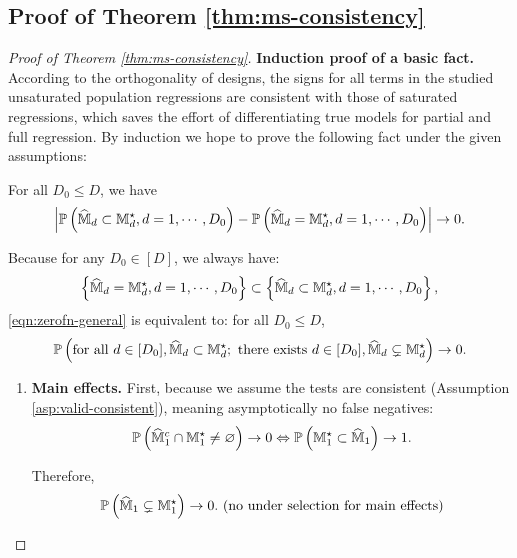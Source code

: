 \documentclass[12pt]{article}
\begin{document}
\subsection{Proof of Theorem \ref{thm:ms-consistency}}
{
\begin{proof}[Proof of Theorem \ref{thm:ms-consistency}]
\textbf{Induction proof of a basic fact.} According to the orthogonality of designs, the signs for all terms in the studied unsaturated population regressions are consistent with those of saturated regressions, which saves the effort of differentiating true models for partial and full regression. By induction we hope to prove the following fact under the given assumptions:


\begin{displayquote}
For all $D_0\le D$, we have 
\begin{align}\label{eqn:zerofn-general}
\left|{\mathbb{P}}\left(\widehat{{\mathbb{M}}}_d\subset{\mathbb{M}}^\star_d, d=1,\cdots,D_0\right)-{\mathbb{P}}\left(\widehat{{\mathbb{M}}}_d={\mathbb{M}}^\star_d, d=1,\cdots,D_0\right)\right|\to 0.
\end{align} 
\end{displayquote}

Because for any $D_0\in[D]$, we always have:
$$\left\{\widehat{{\mathbb{M}}}_d={\mathbb{M}}^\star_d, d=1,\cdots,D_0\right\}\subset\left\{\widehat{{\mathbb{M}}}_d\subset{\mathbb{M}}^\star_d, d=1,\cdots,D_0\right\},$$ 
\eqref{eqn:zerofn-general} is equivalent to: for all $D_0\le D$,
\begin{align}\label{eqn:zerofn-general-1}
{\mathbb{P}}\left(\text{for all } d\in[D_0],\widehat{{\mathbb{M}}}_d\subset{\mathbb{M}}^\star_d; \text{ there exists } d\in[D_0], \widehat{{\mathbb{M}}}_d\subsetneq{\mathbb{M}}^\star_d\right)\to 0.
\end{align} 


\begin{enumerate}
    \item \textbf{Main effects.}
    First, because we assume the tests are consistent (Assumption \ref{asp:valid-consistent}), meaning asymptotically no false negatives:
    \begin{align*}
        {\mathbb{P}}\left({\widehat{{\mathbb{M}}}_1}^c \cap{\mathbb{M}}^\star_1\neq \varnothing\right)\to 0 \Leftrightarrow {\mathbb{P}}\left({\mathbb{M}}^\star_1\subset{\widehat{{\mathbb{M}}}_1}\right)\to 1.
    \end{align*}
     
    Therefore,
    \begin{align}\label{eqn:zerofn-general-2}
      {\mathbb{P}}\left(\widehat{{\mathbb{M}}}_1\subsetneq{\mathbb{M}}^\star_1\right)\to 0. \text{ (no under selection for main effects)}
    \end{align} 
    

\end{enumerate}
\end{proof}}
\end{document}
